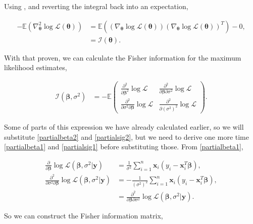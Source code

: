 \documentclass[honours,12pt]{unswthesis}
\newcommand{\E}{\mathbb{E}}
\newcommand{\s}{\sum_{i=1}^{n}}
\newcommand{\ta}{\bm{\theta}}
\newcommand{\LL}{\log{\mathcal{L}}}
\numberwithin{equation}{section}
\begin{document}
\noindent Using , and reverting the integral back into an expectation,

\begin{align*}
	-\E \left( \nabla_{\ta}^{2} \LL (\ta) \right) &= \E \left( \left( \nabla_{\ta} \LL (\ta) \right) \left( \nabla_{\ta} \LL (\ta) \right)^{T}  \right) - 0,\\
	&= \mathcal{I} (\ta).
\end{align*}

With that proven, we can calculate the Fisher information for the maximum likelihood estimates,

\begin{align*}
	\mathcal{I}(\bm{\beta},\sigma^{2}) &= -\E \begin{pmatrix} \frac{\partial^{2}}{\partial \bm{\beta}^{2}}\log{\mathcal{L}} & \frac{\partial^{2}}{\partial \bm{\beta} \partial \sigma^{2}}\log{\mathcal{L}} \\ \frac{\partial^{2}}{\partial \sigma^{2} \partial \bm{\beta}}\log{\mathcal{L}} & \frac{\partial^{2}}{\partial \left(\sigma^{2} \right)^{2}}\log{\mathcal{L}} \end{pmatrix}.
\end{align*}

\noindent Some of parts of this expression we have already calculated earlier, so we will substitute \eqref{partialbeta2} and \eqref{partialsig2}, but we need to derive one more time \eqref{partialbeta1} and \eqref{partialsig1} before substituting those. From \eqref{partialbeta1},

\begin{align*}
	\frac{\partial}{\partial \bm{\beta}}  \log\mathcal{L}(\bm{\beta},\sigma^{2} | \mathbf{y}) &= \frac{1}{\sigma^{2}} \s \mathbf{x}_{i} \left( y_{i} - \mathbf{x}_{i}^{T} \bm{\beta} \right),\\
	\frac{\partial^{2}}{\partial \sigma^{2} \partial \bm{\beta}} \log\mathcal{L}(\bm{\beta},\sigma^{2} | \mathbf{y}) &= -\frac{1}{\left( \sigma^{2} \right)^{2}} \s \mathbf{x}_{i} \left( y_{i} - \mathbf{x}_{i}^{T} \bm{\beta} \right), \\
	&= \frac{\partial^{2}}{\partial \bm{\beta} \partial \sigma^{2}} \log\mathcal{L}(\bm{\beta},\sigma^{2} | \mathbf{y}).
\end{align*}

\noindent So we can construct the Fisher information matrix, 
\end{document}
